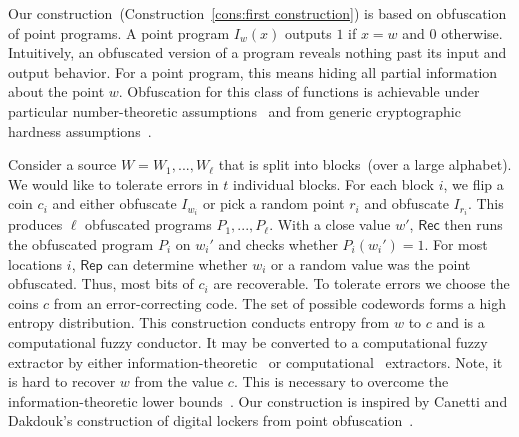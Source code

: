 \documentclass[11pt]{article}
\newcommand{\consref}[1]{\mbox{Construction~\ref{#1}}}
\newcommand{\class}[1]{{\ensuremath{\mathsf{#1}}}}
\newcommand{\rep}{\ensuremath{\class{Rep}}\xspace}
\newcommand{\rec}{\ensuremath{\class{Rec}}\xspace}
\begin{document}
Our construction~(\consref{cons:first construction}) is based on obfuscation of point programs.  A point program $I_w(x)$ outputs $1$ if $x=w$ and $0$ otherwise.  Intuitively, an obfuscated version of a program reveals nothing past its input and output behavior.  For a point program, this means hiding all partial information about the point $w$.  Obfuscation for this class of functions is achievable under particular number-theoretic assumptions~\cite{canetti1997towards} and from generic cryptographic hardness assumptions~\cite{wee2005obfuscating}.  

Consider a source $W = W_1,..., W_\ell$ that is split into blocks~(over a large alphabet).  We would like to tolerate errors in $t$ individual blocks.  For each block $i$, we flip a coin $c_i$ and either obfuscate $I_{w_i}$ or pick a random point $r_i$ and obfuscate $I_{r_i}$.  This produces $\ell$ obfuscated programs $P_1,..., P_\ell$.  With a close value $w'$, $\rec$ then runs the obfuscated program $P_i$ on $w_i'$ and checks whether $P_i(w_i')=1$.  For most locations $i$, \rep can determine whether $w_i$ or a random value was the point obfuscated.  Thus, most bits of $c_i$ are recoverable. To tolerate errors we choose the coins $c$ from an error-correcting code.  The set of possible codewords forms a high entropy distribution.  This construction conducts entropy from $w$ to $c$ and is a computational fuzzy conductor.  It may be converted to a computational fuzzy extractor by either information-theoretic~\cite{nisan1993randomness} or computational~\cite{krawczyk2010cryptographic} extractors.  Note, it is hard to recover $w$ from the value $c$.   This is necessary to overcome the information-theoretic lower bounds~\cite[Section 3.3]{fuller2013computational}.  
Our construction is inspired by Canetti and Dakdouk's construction of digital lockers from point obfuscation~\cite{canetti2008obfuscating}.  
\end{document}
